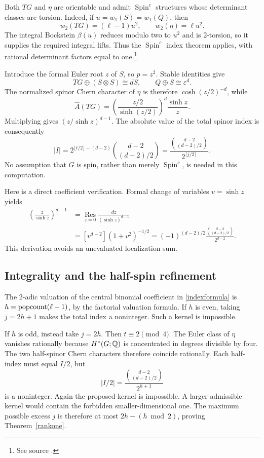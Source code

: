 \documentclass[11pt]{article}
\theoremstyle{remark}\newtheorem{remark}[theorem]{Remark}
\newcommand{\eps}{\varepsilon}\newcommand{\Gr}{\operatorname{Gr}}
\newcommand{\fnref}[1]{\footnote{See source \cite{#1}.}}
\begin{document}
Both $TG$ and $\eta$ are orientable and admit $\operatorname{Spin}^c$
structures whose determinant classes are torsion. Indeed, if
$u=w_1(S)=w_1(Q)$, then
\[
 w_2(TG)=(\ell-1)u^2,
 \qquad w_2(\eta)=\ell u^2.
\]
The integral Bockstein $\beta(u)$ reduces modulo two to $u^2$ and is
2-torsion, so it supplies the required integral lifts. Thus the
$\operatorname{Spin}^c$ index theorem applies, with rational determinant
factors equal to one.\fnref{lm}

Introduce the formal Euler root $z$ of $S$, so $p=z^2$. Stable identities give
\[
 TG\oplus(S\otimes S)\cong dS,\qquad Q\oplus S\cong\eps^d.
\]
The normalized spinor Chern character of $\eta$ is therefore
$\cosh(z/2)^{-d}$, while
\[
 \widehat A(TG)=
 \left(\frac{z/2}{\sinh(z/2)}\right)^d\frac{\sinh z}{z}.
\]
Multiplying gives $(z/\sinh z)^{d-1}$. The absolute value of the total
spinor index is consequently
\begin{equation}\label{indexformula}
 |I|=2^{\lfloor t/2\rfloor-(d-2)}
 \binom{d-2}{(d-2)/2}
 =\frac{\binom{d-2}{(d-2)/2}}{2^{\lceil j/2\rceil}}.
\end{equation}
No assumption that $G$ is spin, rather than merely $\operatorname{Spin}^c$,
is needed in this computation.

Here is a direct coefficient verification. Formal change of variables
$v=\sinh z$ yields
\begin{align*}
 [z^{d-2}]\left(\frac z{\sinh z}\right)^{d-1}
 &=\operatorname*{Res}_{z=0}\frac{dz}{(\sinh z)^{d-1}}\\
 &=[v^{d-2}](1+v^2)^{-1/2}
 =(-1)^{(d-2)/2}\frac{\binom{d-2}{(d-2)/2}}{2^{d-2}}.
\end{align*}
This derivation avoids an unevaluated localization sum.

\subsection{Integrality and the half-spin refinement}
The 2-adic valuation of the central binomial coefficient in
\eqref{indexformula} is $h=\operatorname{popcount}(\ell-1)$, by the factorial valuation formula.
If $h$ is even, taking $j=2h+1$ makes the total index a noninteger. Such a
kernel is impossible.

If $h$ is odd, instead take $j=2h$. Then $t\equiv2\pmod4$. The Euler class
of $\eta$ vanishes rationally because $H^*(G;\mathbb Q)$ is concentrated in degrees
divisible by four. The two half-spinor Chern characters therefore coincide
rationally. Each half-index must equal $I/2$, but
\[
 |I/2|=\frac{\binom{d-2}{(d-2)/2}}{2^{h+1}}
\]
is a noninteger. Again the proposed kernel is impossible. A larger admissible
kernel would contain the forbidden smaller-dimensional one. The maximum
possible excess $j$ is therefore at most $2h-(h\bmod2)$, proving
Theorem~\ref{rankone}.
\end{document}

